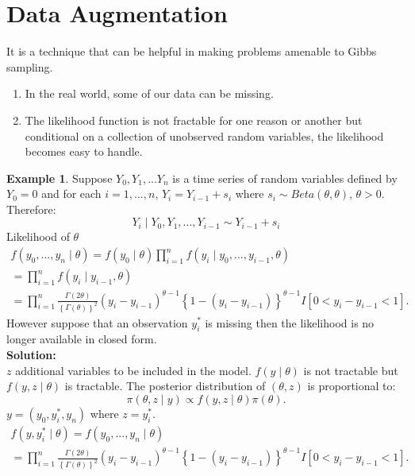 \documentclass[lecture,12pt,]{pcms-l}
\numberwithin{section}{chapter}
\numberwithin{equation}{chapter}
\theoremstyle{plain}
\theoremstyle{definition}
\newtheorem{example}{Example}[section]
\theoremstyle{definition}
\begin{document}
\section{Data Augmentation}
It is a technique that can be helpful in making problems amenable to Gibbs sampling.
\begin{enumerate}
\item In the real world, some of our data can be missing.
\item The likelihood function is not fractable for one reason or another but conditional on a collection of unobserved random variables, the likelihood becomes easy to handle.
\end{enumerate}
\begin{example}
Suppose $Y_0,Y_1,...Y_n$ is a time series of random variables defined by $Y_0=0$ and for each $i=1,...,n$, $Y_i=Y_{i-1}+s_i$ where $s_i \sim Beta(\theta,\theta)$, $\theta>0$. Therefore:
\begin{equation}
Y_i \mid Y_0,Y_1,...,Y_{i-1} \sim Y_{i-1}+s_i
\end{equation} 
Likelihood of $\theta$
\begin{equation}
\begin{split}
f(y_0,...,y_n \mid \theta)=f(y_0 \mid \theta)\prod_{i=1}^{n}f(y_i \mid y_0,...,y_{i-1},\theta)
\\
=\prod_{i=1}^{n}f(y_i \mid y_{i-1},\theta)
\\
=\prod_{i=1}^{n}\frac{\Gamma(2 \theta)}{\left \{  \Gamma(\theta) \right \}^2}(y_i-y_{i-1})^{\theta-1} \left \{  1- (y_i-y_{i-1}) \right \}^{\theta-1} I \left [ 0<y_i-y_{i-1}<1 \right ].
\end{split}
\end{equation}
However suppose that an observation $y_{i}^{*}$ is missing then the likelihood is no longer available in closed form.
\\
\textbf{Solution:}\\
$z$ additional variables to be included in the model. $f(y \mid \theta)$ is not tractable but $f(y,z \mid \theta)$ is tractable. The posterior distribution of $(\theta,z)$ is proportional to:
\begin{equation}
\pi(\theta , z \mid y) \propto f(y,z \mid \theta)\pi(\theta). 
\end{equation}
$y=(y_0,y_{i}^{*},y_n)$ where $z=y_{i}^*$.
\begin{equation}
\begin{split}
f(y,y_{i}^* \mid \theta)=f(y_0,...,y_n \mid \theta)
\\
=\prod_{i=1}^{n}\frac{\Gamma(2 \theta)}{\left \{  \Gamma(\theta) \right \}^2}(y_i-y_{i-1})^{\theta-1} \left \{  1- (y_i-y_{i-1}) \right \}^{\theta-1} I \left [ 0<y_i-y_{i-1}<1 \right ].

\end{split}
\end{equation}
\end{example}
\end{document}
